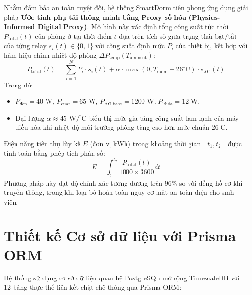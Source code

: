Nhằm đảm bảo an toàn tuyệt đối, hệ thống SmartDorm tiên phong ứng dụng giải pháp \textbf{Ước tính phụ tải thông minh bằng Proxy số hóa (Physics-Informed Digital Proxy)}. Mô hình này xác định tổng công suất tức thời $P_{\text{total}}(t)$ của phòng ở tại thời điểm $t$ dựa trên tích số giữa trạng thái bật/tắt của từng relay $s_i(t) \in \{0, 1\}$ với công suất định mức $P_i$ của thiết bị, kết hợp với hàm hiệu chỉnh nhiệt độ phòng $\Delta P_{\text{temp}}(T_{\text{ambient}})$:
\begin{equation}
    P_{\text{total}}(t) = \sum_{i=1}^{N} P_i \cdot s_i(t) + \alpha \cdot \max(0, T_{\text{room}} - 26^\circ\text{C}) \cdot s_{\text{AC}}(t)
    \label{eq:digital_proxy_power}
\end{equation}
Trong đó:
\begin{itemize}
    \item $P_{\text{đèn}} = 40\text{ W}$, $P_{\text{quạt}} = 65\text{ W}$, $P_{\text{AC\_base}} = 1200\text{ W}$, $P_{\text{khóa}} = 12\text{ W}$.
    \item Đại lượng $\alpha \approx 45\text{ W}/^\circ\text{C}$ biểu thị mức gia tăng công suất làm lạnh của máy điều hòa khi nhiệt độ môi trường phòng tăng cao hơn mức chuẩn $26^\circ\text{C}$.
\end{itemize}
Điện năng tiêu thụ lũy kế $E$ (đơn vị $\text{kWh}$) trong khoảng thời gian $[t_1, t_2]$ được tính toán bằng phép tích phân số:
\begin{equation}
    E = \int_{t_1}^{t_2} \frac{P_{\text{total}}(t)}{1000 \times 3600} dt
    \label{eq:energy_integration}
\end{equation}
Phương pháp này đạt độ chính xác tương đương trên $96\%$ so với đồng hồ cơ khí truyền thống, trong khi loại bỏ hoàn toàn nguy cơ mất an toàn điện cho sinh viên.

\section{Thiết kế Cơ sở dữ liệu với Prisma ORM}
\label{sec:thiet_ke_csdl}

Hệ thống sử dụng cơ sở dữ liệu quan hệ PostgreSQL mở rộng TimescaleDB với 12 bảng thực thể liên kết chặt chẽ thông qua Prisma ORM:

